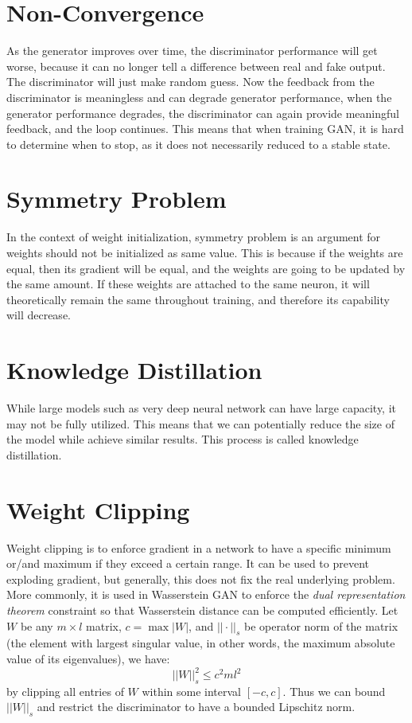 \section{Non-Convergence}
\label{app:ml:non_conv}
As the generator improves over time, the discriminator performance will get worse, because it can no longer tell a difference between real and fake output. The discriminator will just make random guess. Now the feedback from the discriminator is meaningless and can degrade generator performance, when the generator performance degrades, the discriminator can again provide meaningful feedback, and the loop continues. This means that when training GAN, it is hard to determine when to stop, as it does not necessarily reduced to a stable state.

\section{Symmetry Problem}
\label{app:ml:sym}
In the context of weight initialization, symmetry problem is an argument for weights should not be initialized as same value. This is because if the weights are equal, then its gradient will be equal, and the weights are going to be updated by the same amount. If these weights are attached to the same neuron, it will theoretically remain the same throughout training, and therefore its capability will decrease.

\section{Knowledge Distillation}
\label{app:ml:kd}
While large models such as very deep neural network can have large capacity, it may not be fully utilized. This means that we can potentially reduce the size of the model while achieve similar results. This process is called knowledge distillation.

\section{Weight Clipping}
\label{app:ml:weight_clip}
Weight clipping is to enforce gradient in a network to have a specific minimum or/and maximum if they exceed a certain range. It can be used to prevent exploding gradient, but generally, this does not fix the real underlying problem. More commonly, it is used in Wasserstein GAN to enforce the \textit{dual representation theorem} constraint so that Wasserstein distance can be computed efficiently. Let $W$ be any $m\times l$ matrix, $c=\max|W|$, and $||\cdot||_s$ be operator norm of the matrix (the element with largest singular value, in other words, the maximum absolute value of its eigenvalues), we have:
$$
||W||_s^2\leq c^2ml^2
$$
by clipping all entries of $W$ within some interval $[-c, c]$. Thus we can bound $||W||_s$ and restrict the discriminator to have a bounded Lipschitz norm.

